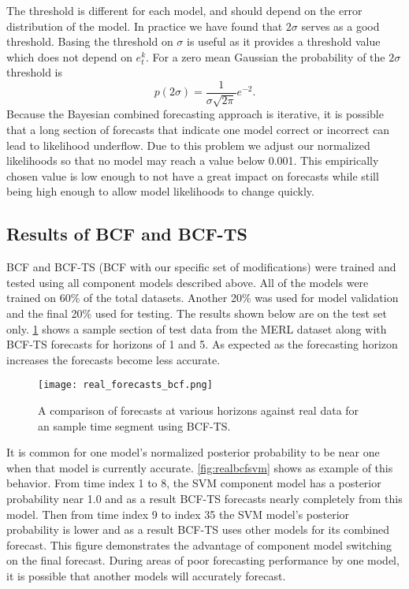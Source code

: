 The threshold is different for each model, and should depend on the error distribution of the model.  In practice we have found that $2\sigma$ serves as a good threshold.  Basing the threshold on $\sigma$ is useful as it provides a threshold value which does not depend on $e^{k}_{t}$.  For a zero mean Gaussian the probability of the $2\sigma$ threshold is
\begin{equation}
p(2\sigma) = \frac{1}{\sigma\sqrt{2\pi}}e^{-2}.
\end{equation}
Because the Bayesian combined forecasting approach is iterative, it is possible that a long section of forecasts that indicate one model correct or incorrect can lead to likelihood underflow.  Due to this problem we adjust our normalized likelihoods so that no model may reach a value below 0.001.  This empirically chosen value is low enough to not have a great impact on forecasts while still being high enough to allow model likelihoods to change quickly.

\subsection{Results of BCF and BCF-TS}

BCF and BCF-TS (BCF with our specific set of modifications) were trained and tested using all component models described above.  All of the models were trained on 60\% of the total datasets.  Another 20\% was used for model validation and the final 20\% used for testing.  The results shown below are on the test set only.  \ref{fig:realbcf} shows a sample section of test data from the MERL dataset along with BCF-TS forecasts for horizons of 1 and 5.  As expected as the forecasting horizon increases the forecasts become less accurate.

\begin{figure}[h]
\centering
\texttt{[image: real\_forecasts\_bcf.png]}
\caption{A comparison of forecasts at various horizons against real data for an sample time segment using BCF-TS.}
\label{fig:realbcf}
\end{figure}

It is common for one model's normalized posterior probability to be near one when that model is currently accurate.  \ref{fig:realbcfsvm} shows as example of this behavior.  From time index 1 to 8, the SVM component model has a posterior probability near 1.0 and as a result BCF-TS forecasts nearly completely from this model.  Then from time index 9 to index 35 the SVM model's posterior probability is lower and as a result BCF-TS uses other models for its combined forecast.  This figure demonstrates the advantage of component model switching on the final forecast.  During areas of poor forecasting performance by one model, it is possible that another models will accurately forecast.

